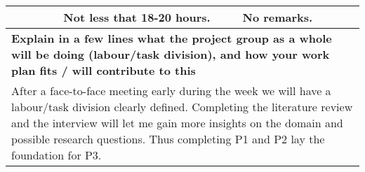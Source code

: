 \documentclass[a4paper]{article}
\begin{document}
\begin{center}
\begin{tabular}{ | p{6cm} | p{6cm} | p{6cm} | p{6cm} | }
\begin{enumerate}
    \end{enumerate} &
    Not less that 18-20 hours. &
    \multicolumn{2}{|l|}{No remarks.} \\
    \hline
    \multicolumn{4}{|p{24cm}|}{\textbf{Explain in a few lines what the project
    group as a whole will be doing (labour/task division), and how  your work
    plan fits / will contribute to this}} \\
    \multicolumn{4}{|p{24cm}|}{After a face-to-face meeting early during the
    week we will have a labour/task division clearly defined. Completing the
    literature review and the interview will let me gain more insights on the
    domain and possible research questions. Thus completing P1 and P2 lay the
    foundation for P3.} \\
    \hline
  \end{tabular}
  \egroup
\end{center}
\end{document}
